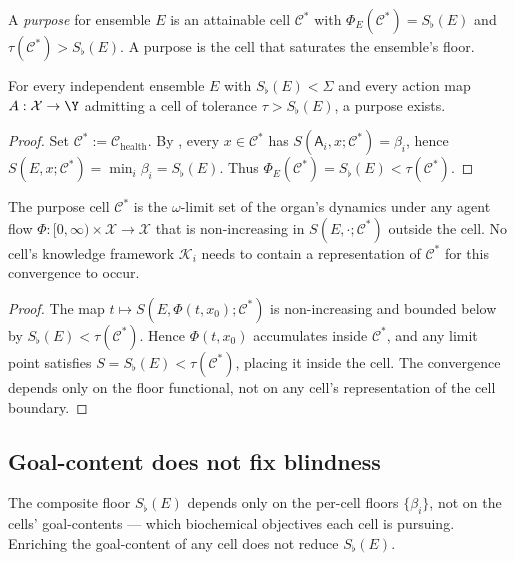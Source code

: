 \documentclass[twocolumn,11pt,a4paper]{article}
\newcommand{\Sfloor}{S_{\flat}}
\newcommand{\agent}{\mathsf{A}}
\newcommand{\Cell}{\mathcal{C}}
\newcommand{\X}{\mathcal{X}}
\newcommand{\K}{\mathcal{K}}
\begin{document}
\begin{definition}[Purpose]\label{def:purpose}
A \emph{purpose} for ensemble $E$ is an attainable cell $\Cell^*$ with
$\Phi_E(\Cell^*) = \Sfloor(E)$ and $\tau(\Cell^*) > \Sfloor(E)$.
A purpose is the cell that saturates the ensemble's floor.
\end{definition}

\begin{theorem}\label{thm:purpose}
For every independent ensemble $E$ with $\Sfloor(E) < \Sigma$ and every
action map $A:\X\to\Y$ admitting a cell of tolerance $\tau > \Sfloor(E)$,
a purpose exists.
\end{theorem}

\begin{proof}
Set $\Cell^* := \Cell_{\mathrm{health}}$. By ,
every $x\in\Cell^*$ has $S(\agent_i, x; \Cell^*) = \beta_i$, hence
$S(E, x; \Cell^*) = \min_i \beta_i = \Sfloor(E)$. Thus
$\Phi_E(\Cell^*) = \Sfloor(E) < \tau(\Cell^*)$.
\end{proof}

\begin{theorem}\label{thm:attractor}
The purpose cell $\Cell^*$ is the $\omega$-limit set of the organ's
dynamics under any agent flow $\Phi:[0,\infty)\times\X\to\X$ that is
non-increasing in $S(E,\cdot;\Cell^*)$ outside the cell. No cell's
knowledge framework $\K_i$ needs to contain a representation of $\Cell^*$
for this convergence to occur.
\end{theorem}

\begin{proof}
The map $t\mapsto S(E, \Phi(t,x_0); \Cell^*)$ is non-increasing and bounded
below by $\Sfloor(E) < \tau(\Cell^*)$. Hence $\Phi(t,x_0)$ accumulates
inside $\Cell^*$, and any limit point satisfies $S = \Sfloor(E) < \tau(\Cell^*)$,
placing it inside the cell. The convergence depends only on the floor
functional, not on any cell's representation of the cell boundary.
\end{proof}

\subsection{Goal-content does not fix blindness}

\begin{theorem}\label{thm:mothet}
The composite floor $\Sfloor(E)$ depends only on the per-cell floors
$\{\beta_i\}$, not on the cells' goal-contents --- which biochemical
objectives each cell is pursuing. Enriching the goal-content of any
cell does not reduce $\Sfloor(E)$.
\end{theorem}
\end{document}
